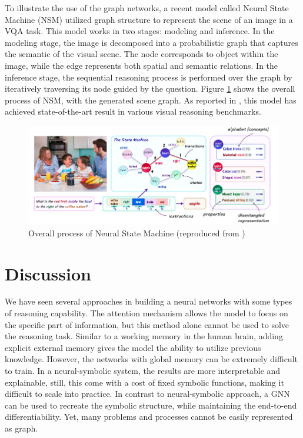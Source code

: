 \documentclass[journal]{IEEEtran}
\begin{document}
To illustrate the use of the graph networks, a recent model called Neural State Machine (NSM) \cite{hudson2019learning} utilized graph structure to represent the scene of an image in a VQA task.
This model works in two stages: modeling and inference. 
In the modeling stage, the image is decomposed into a probabilistic graph that captures the semantic of the visual scene.
The node corresponds to object within the image, while the edge represents both spatial and semantic relations.
In the inference stage, the sequential reasoning process is performed over the graph by iteratively traversing its node guided by the question.
Figure \ref{nsm} shows the overall process of NSM, with the generated scene graph.
As reported in \cite{hudson2019learning}, this model has achieved state-of-the-art result in various visual reasoning benchmarks.

\begin{figure}[htb]
  \includegraphics[width=\linewidth]{NSM.png}
  \caption{Overall process of Neural State Machine (reproduced from \cite{hudson2019learning})}
  \label{nsm}
\end{figure}

\section{Discussion}

We have seen several approaches in building a neural networks with some types of reasoning capability.
The attention mechanism allows the model to focus on the specific part of information, 
but this method alone cannot be used to solve the reasoning task.
Similar to a working memory in the human brain, 
adding explicit external memory gives the model the ability to utilize previous knowledge.
However, the networks with global memory can be extremely difficult to train. 
In a neural-symbolic system, the results are more interpretable and explainable,
still, this come with a cost of fixed symbolic functions, making it difficult to scale into practice.
In contrast to neural-symbolic approach, a GNN can be used to recreate the symbolic structure, 
while maintaining the end-to-end differentiability. Yet, many problems and processes cannot be easily represented as graph.
\end{document}
